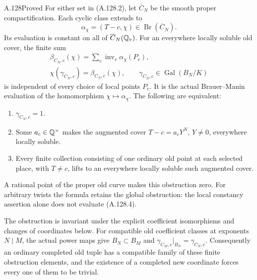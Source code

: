 \begin{statement}{A.128}{Proved}
For either set in (A.128.2), let $\overline C_N$ be the
smooth proper compactification.
Each cyclic class extends to
\[
              \alpha_\chi=(T-c,\chi)\in\operatorname{Br}(\overline C_N).
\tag{A.128.3}
\]
Its evaluation is constant on all of $\overline C_N(\mathbb Q_v)$.
For an everywhere locally soluble old cover, the finite sum
\[
 \begin{gathered}
 \beta_{C_N,c}(\chi)=
     \sum_v\operatorname{inv}_v\alpha_\chi(P_v),\\
 \chi(\gamma_{C_N,c})=\beta_{C_N,c}(\chi),\qquad
            \gamma_{C_N,c}\in\operatorname{Gal}(B_N/K)
 \end{gathered}
\tag{A.128.4}
\]
is independent of every choice of local points $P_v$.
It is the actual Brauer--Manin evaluation of the homomorphism
$\chi\mapsto\alpha_\chi$.
The following are equivalent:
\begin{enumerate}
\item $\gamma_{C_N,c}=1$.
\item Some $a_c\in\mathbb Q^\times$ makes the augmented cover
      $T-c=a_cY^N$, $Y\ne0$, everywhere locally soluble.
\item Every finite collection consisting of one ordinary old point
      at each selected place, with $T\ne c$, lifts to an
      everywhere locally soluble such augmented cover.
\end{enumerate}
A rational point of the proper old curve makes this obstruction zero.
For arbitrary twists the formula retains the global obstruction:
the local constancy assertion alone does not evaluate (A.128.4).

The obstruction is invariant under the explicit coefficient
isomorphisms and changes of coordinates below.
For compatible old coefficient classes at exponents $N\mid M$,
the actual power maps give
$B_N\subset B_M$ and
$\gamma_{C_M,c}|_{B_N}=\gamma_{C_N,c}$.
Consequently an ordinary completed old tuple has a compatible
family of these finite obstruction elements, and the existence
of a completed new coordinate forces every one of them to be trivial.
\end{statement}
